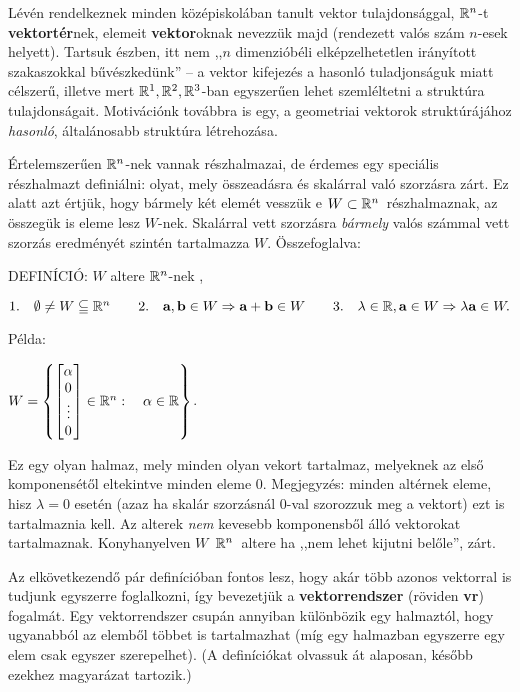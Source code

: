 \documentclass[a4paper,11.5pt]{article}
\begin{document}
	
	Lévén rendelkeznek minden középiskolában tanult vektor tulajdonsággal, $\mathbb{R}^{n}$-t \textbf{vektortér}nek, elemeit \textbf{vektor}oknak nevezzük majd (rendezett valós szám $n$-esek helyett). Tartsuk észben, itt nem ,,$n$ dimenzióbéli elképzelhetetlen irányított szakaszokkal bűvészkedünk'' -- a vektor kifejezés a hasonló tuladjonságuk miatt célszerű, illetve mert $\mathbb{R}^1, \mathbb{R}^2, \mathbb{R}^3$-ban egyszerűen lehet szemléltetni a struktúra tulajdonságait. Motivációnk továbbra is egy, a geometriai vektorok struktúrájához \textit{hasonló}, általánosabb struktúra létrehozása.
	
	Értelemszerűen $\mathbb{R}^{n}$-nek vannak részhalmazai, de érdemes egy speciális részhalmazt definiálni: olyat, mely összeadásra és skalárral való szorzásra zárt. Ez alatt azt értjük, hogy bármely két elemét vesszük e $W \subset \mathbb{R}^{n}$~részhalmaznak, az összegük is eleme lesz $W$-nek. Skalárral vett szorzásra \emph{bármely} valós számmal vett szorzás eredményét szintén tartalmazza $W$. Összefoglalva:
	
	 DEFINÍCIÓ: $W$ { altere} $\mathbb{R}^{n}${-nek} ,  
	
	\noindent $\text{1.}\quad  \emptyset\not= W\subseteqq  \mathbb{R}^{n}  \qquad 
	\text{2.}\quad \textbf{a} ,\textbf{b} \in W \Rightarrow \textbf{a} +\textbf{b} \in W \qquad 
	\text{3.}\quad \lambda \in  \mathbb{R} , \textbf{a} \in W \Rightarrow \lambda \textbf{a} \in W .$ 
	
	\medskip
	\noindent Példa:
	
	{\centering 
		$W=\left\{
	\begin{bmatrix}
		\alpha\s\\
		0\s\\
		\vdots \\
		0\s\\
	\end{bmatrix} \in \Rn: \quad \alpha\in \R \right\}$.
	\par}
	
	\noindent Ez egy olyan halmaz, mely minden olyan vekort tartalmaz, melyeknek az első komponensétől eltekintve minden eleme 0. 
	Megjegyzés: \0 minden altérnek eleme, hisz $\lambda=0$ esetén (azaz ha skalár szorzásnál 0-val szorozzuk meg a vektort) ezt is tartalmaznia kell. Az alterek \emph{nem} kevesebb komponensből álló vektorokat tartalmaznak. Konyhanyelven $W$~$\mathbb{R}^{n}$~altere ha ,,nem lehet kijutni belőle'', zárt.
	
	\medskip
	Az elkövetkezendő pár definícióban fontos lesz, hogy akár több azonos vektorral is tudjunk egyszerre foglalkozni, így bevezetjük a \textbf{vektorrendszer} (röviden \textbf{vr}) fogalmát. Egy vektorrendszer csupán annyiban különbözik egy halmaztól, hogy ugyanabból az elemből többet is tartalmazhat (míg egy halmazban egyszerre egy elem csak egyszer szerepelhet). (A definíciókat olvassuk át alaposan, később ezekhez magyarázat tartozik.)
	
\end{document}
